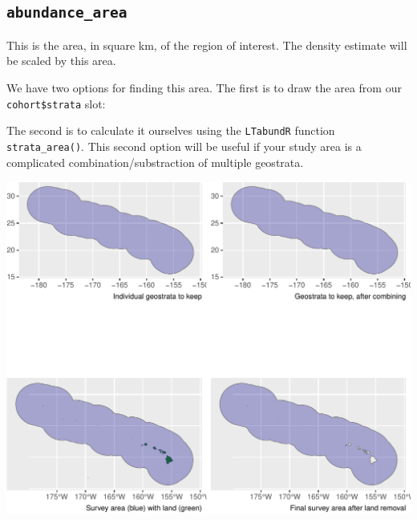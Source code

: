 \documentclass[
]{book}
\newenvironment{Shaded}{\begin{snugshade}}{\end{snugshade}}
\newcommand{\AttributeTok}[1]{\textcolor[rgb]{0.77,0.63,0.00}{#1}}
\newcommand{\DecValTok}[1]{\textcolor[rgb]{0.00,0.00,0.81}{#1}}
\newcommand{\FunctionTok}[1]{\textcolor[rgb]{0.00,0.00,0.00}{#1}}
\newcommand{\NormalTok}[1]{#1}
\newcommand{\OtherTok}[1]{\textcolor[rgb]{0.56,0.35,0.01}{#1}}
\newcommand{\SpecialCharTok}[1]{\textcolor[rgb]{0.00,0.00,0.00}{#1}}
\newcommand{\StringTok}[1]{\textcolor[rgb]{0.31,0.60,0.02}{#1}}
\begin{document}
\hypertarget{abundance_area}{%
\subsection*{\texorpdfstring{\texttt{abundance\_area}}{abundance\_area}}\label{abundance_area}}

This is the area, in square km, of the region of interest. The density estimate will be scaled by this area.

We have two options for finding this area. The first is to draw the area from our \texttt{cohort\$strata} slot:

\begin{Shaded}
\end{Shaded}

The second is to calculate it ourselves using the \texttt{LTabundR} function \texttt{strata\_area()}. This second option will be useful if your study area is a complicated combination/substraction of multiple geostrata.

\begin{Shaded}
\end{Shaded}

\includegraphics{figures/unnamed-chunk-299-1.pdf}
\end{document}
